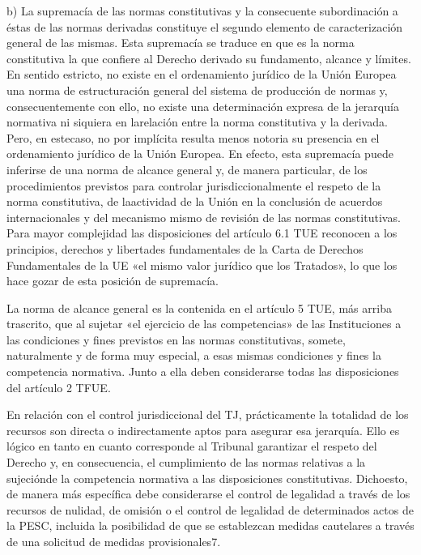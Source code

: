 \documentclass[10pt,a4paper]{article}
\begin{document}
b) La supremacía de las normas constitutivas y la consecuente subordinación a éstas de las normas derivadas constituye el segundo elemento de caracterización general de las mismas. Esta supremacía se traduce en que es la norma constitutiva la que confiere al Derecho derivado su fundamento, alcance y límites. En sentido estricto, no existe en el ordenamiento jurídico de la Unión Europea una norma de estructuración general del sistema de producción de normas y, consecuentemente con ello, no existe una determinación expresa de la jerarquía normativa ni siquiera en larelación entre la norma constitutiva y la derivada. Pero, en estecaso, no por implícita resulta menos notoria su presencia en el ordenamiento jurídico de la Unión Europea. En efecto, esta supremacía puede inferirse de una norma de alcance general y, de manera particular, de los procedimientos previstos para controlar jurisdiccionalmente el respeto de la norma constitutiva, de laactividad de la Unión en la conclusión de acuerdos internacionales y del mecanismo mismo de revisión de las normas constitutivas. Para mayor complejidad las disposiciones del artículo 6.1 TUE reconocen a los principios, derechos y libertades fundamentales de la Carta de Derechos Fundamentales de la UE «el mismo valor jurídico que los Tratados», lo que los hace gozar de esta posición de supremacía. 

La norma de alcance general es la contenida en el artículo 5 TUE, más arriba trascrito, que al sujetar «el ejercicio de las competencias» de las Instituciones a las condiciones y fines previstos en las normas constitutivas, somete, naturalmente y de forma muy especial, a esas mismas condiciones y fines la competencia normativa. Junto a ella deben considerarse todas las disposiciones del artículo 2 TFUE.

En relación con el control jurisdiccional del TJ, prácticamente la totalidad de los recursos son directa o indirectamente aptos para asegurar esa jerarquía. Ello es lógico en tanto en cuanto corresponde al Tribunal garantizar el respeto del Derecho y, en consecuencia, el cumplimiento de las normas relativas a la sujeciónde la competencia normativa a las disposiciones constitutivas. Dichoesto, de manera más específica debe considerarse el control de legalidad a través de los recursos de nulidad, de omisión o el control de legalidad de determinados actos de la PESC, incluida la posibilidad de que se establezcan medidas cautelares a través de una solicitud de medidas provisionales7.
\end{document}
